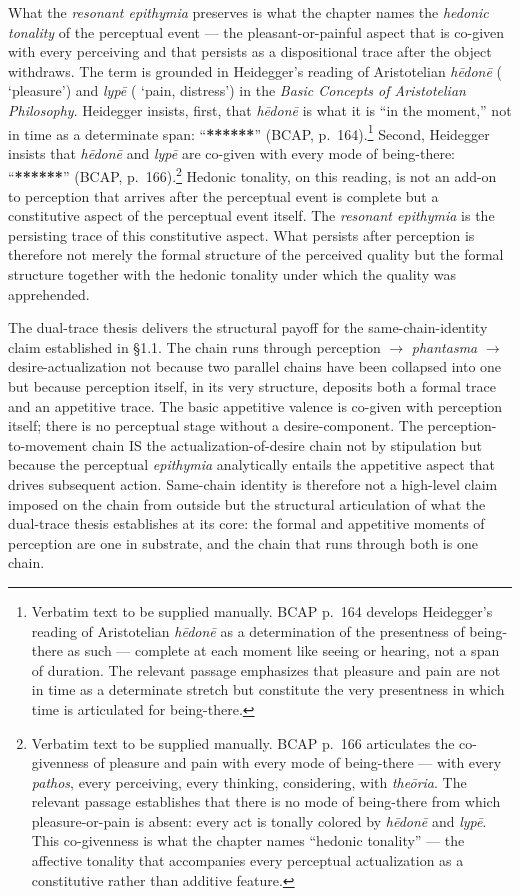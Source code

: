 What the \textit{resonant epithymia} preserves is what the chapter names the \textit{hedonic tonality} of the perceptual event --- the pleasant-or-painful aspect that is co-given with every perceiving and that persists as a dispositional trace after the object withdraws. The term is grounded in Heidegger's reading of Aristotelian \textit{hēdonē} ( `pleasure') and \textit{lypē} ( `pain, distress') in the \textit{Basic Concepts of Aristotelian Philosophy}. Heidegger insists, first, that \textit{hēdonē} is what it is ``in the moment,'' not in time as a determinate span: ``\textbf{******}'' (BCAP, p.~164).\footnote{Verbatim text to be supplied manually. BCAP p.~164 develops Heidegger's reading of Aristotelian \textit{hēdonē} as a determination of the presentness of being-there as such --- complete at each moment like seeing or hearing, not a span of duration. The relevant passage emphasizes that pleasure and pain are not in time as a determinate stretch but constitute the very presentness in which time is articulated for being-there.} Second, Heidegger insists that \textit{hēdonē} and \textit{lypē} are co-given with every mode of being-there: ``\textbf{******}'' (BCAP, p.~166).\footnote{Verbatim text to be supplied manually. BCAP p.~166 articulates the co-givenness of pleasure and pain with every mode of being-there --- with every \textit{pathos}, every perceiving, every thinking, considering, with \textit{theōria}. The relevant passage establishes that there is no mode of being-there from which pleasure-or-pain is absent: every act is tonally colored by \textit{hēdonē} and \textit{lypē}. This co-givenness is what the chapter names ``hedonic tonality'' --- the affective tonality that accompanies every perceptual actualization as a constitutive rather than additive feature.} Hedonic tonality, on this reading, is not an add-on to perception that arrives after the perceptual event is complete but a constitutive aspect of the perceptual event itself. The \textit{resonant epithymia} is the persisting trace of this constitutive aspect. What persists after perception is therefore not merely the formal structure of the perceived quality but the formal structure together with the hedonic tonality under which the quality was apprehended.

The dual-trace thesis delivers the structural payoff for the same-chain-identity claim established in §1.1. The chain runs through perception $\rightarrow$ \textit{phantasma} $\rightarrow$ desire-actualization not because two parallel chains have been collapsed into one but because perception itself, in its very structure, deposits both a formal trace and an appetitive trace. The basic appetitive valence is co-given with perception itself; there is no perceptual stage without a desire-component. The perception-to-movement chain IS the actualization-of-desire chain not by stipulation but because the perceptual \textit{epithymia} analytically entails the appetitive aspect that drives subsequent action. Same-chain identity is therefore not a high-level claim imposed on the chain from outside but the structural articulation of what the dual-trace thesis establishes at its core: the formal and appetitive moments of perception are one in substrate, and the chain that runs through both is one chain.


